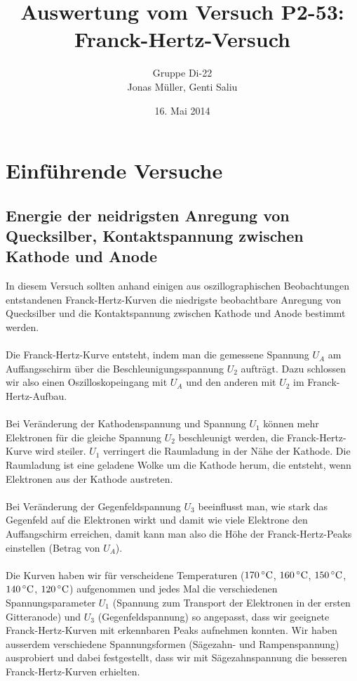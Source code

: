 \documentclass[a4paper,titlepage]{scrartcl}
\title{Auswertung vom Versuch P2-53: Franck-Hertz-Versuch}
\author{Gruppe Di-22\\Jonas Müller, Genti Saliu}
\date{16. Mai 2014}
\numberwithin{equation}{section}
\begin{document}
\begin{titlepage}
\maketitle
\thispagestyle{empty}
\end{titlepage}

\newpage
{}
\tableofcontents

\newpage
{}

\section{Einführende Versuche}
\subsection{Energie der neidrigsten Anregung von Quecksilber, Kontaktspannung zwischen Kathode und Anode}
In diesem Versuch sollten anhand einigen aus oszillographischen Beobachtungen entstandenen Franck-Hertz-Kurven die niedrigste beobachtbare Anregung von Quecksilber und die Kontaktspannung zwischen Kathode und Anode bestimmt werden.\\ \\
Die Franck-Hertz-Kurve entsteht, indem man die gemessene Spannung $U_A$ am Auffangsschirm über die Beschleunigungsspannung $U_2$ aufträgt. Dazu schlossen wir also einen Oszilloskopeingang mit $U_A$ und den anderen mit $U_2$ im Franck-Hertz-Aufbau.\\ \\
Bei Veränderung der Kathodenspannung und Spannung $U_1$ können mehr Elektronen für die gleiche Spannung $U_2$ beschleunigt werden, die Franck-Hertz-Kurve wird steiler. $U_1$ verringert die Raumladung in der Nähe der Kathode. Die Raumladung ist eine geladene Wolke um die Kathode herum, die entsteht, wenn Elektronen aus der Kathode austreten.\\ \\
Bei Veränderung der Gegenfeldspannung $U_3$ beeinflusst man, wie stark das Gegenfeld auf die Elektronen wirkt und damit wie viele Elektrone den Auffangschirm erreichen, damit kann man also die Höhe der Franck-Hertz-Peaks einstellen (Betrag von $U_A$).\\ \\
Die Kurven haben wir für verscheidene Temperaturen ($\unit[170]{^{\circ} C}$, $\unit[160]{^{\circ} C}$, $\unit[150]{^{\circ} C}$, $\unit[140]{^{\circ} C}$, $\unit[120]{^{\circ} C}$) aufgenommen und jedes Mal die verschiedenen Spannungsparameter $U_1$ (Spannung zum Transport der Elektronen in der ersten Gitteranode) und $U_3$ (Gegenfeldspannung) so angepasst, dass wir geeignete Franck-Hertz-Kurven mit erkennbaren Peaks aufnehmen konnten. Wir haben ausserdem verschiedene Spannungsformen (Sägezahn- und Rampenspannung) ausprobiert und dabei festgestellt, dass wir mit Sägezahnspannung die besseren Franck-Hertz-Kurven erhielten.\\ \\
\end{document}
